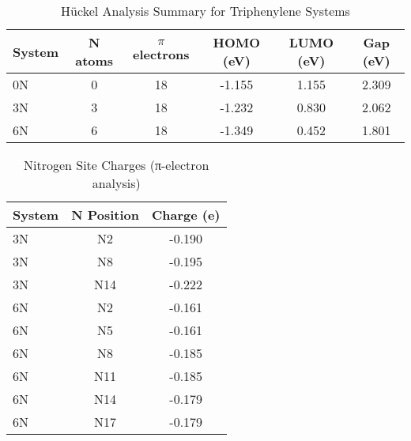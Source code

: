 

\begin{table}[h]
\centering
\caption{Hückel Analysis Summary for Triphenylene Systems}
\begin{tabular}{lccccc}
\hline
System & N atoms & $\pi$ electrons & HOMO (eV) & LUMO (eV) & Gap (eV) \\
\hline
0N & 0 & 18 & -1.155 & 1.155 & 2.309 \\
3N & 3 & 18 & -1.232 & 0.830 & 2.062 \\
6N & 6 & 18 & -1.349 & 0.452 & 1.801 \\
\hline
\end{tabular}
\end{table}


\begin{table}[h]
\centering
\caption{Nitrogen Site Charges (π-electron analysis)}
\begin{tabular}{lcc}
\hline
System & N Position & Charge (e) \\
\hline
3N & N2 & -0.190 \\
3N & N8 & -0.195 \\
3N & N14 & -0.222 \\
6N & N2 & -0.161 \\
6N & N5 & -0.161 \\
6N & N8 & -0.185 \\
6N & N11 & -0.185 \\
6N & N14 & -0.179 \\
6N & N17 & -0.179 \\
\hline
\end{tabular}
\end{table}

